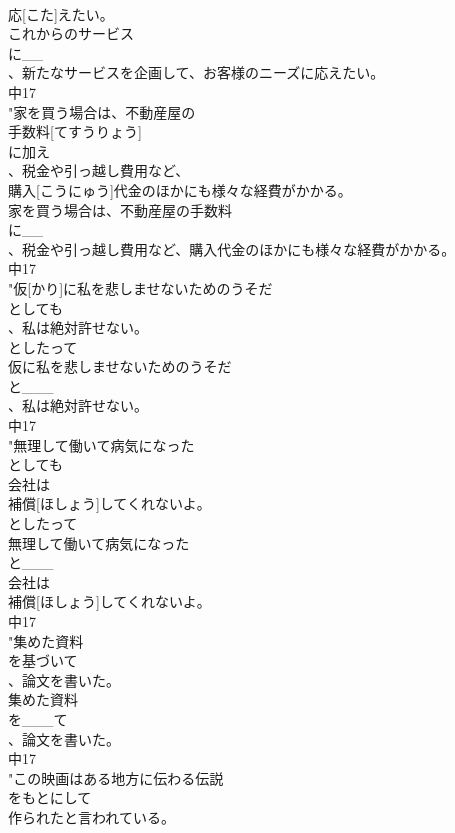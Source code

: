 \documentclass[8pt]{extreport}
\begin{document}
\begin{CJK}{UTF8}{min}
\\	応[こた]えたい。
\\	これからのサービス
\\	に__
\\	、新たなサービスを企画して、お客様のニーズに応えたい。
\\	中17
\\	"家を買う場合は、不動産屋の
\\	手数料[てすうりょう]
\\	に加え
\\	、税金や引っ越し費用など、
\\	購入[こうにゅう]代金のほかにも様々な経費がかかる。
\\	家を買う場合は、不動産屋の手数料
\\	に__
\\	、税金や引っ越し費用など、購入代金のほかにも様々な経費がかかる。
\\	中17
\\	"仮[かり]に私を悲しませないためのうそだ
\\	としても
\\	、私は絶対許せない。
\\	としたって
\\	仮に私を悲しませないためのうそだ
\\	と___
\\	、私は絶対許せない。
\\	中17
\\	"無理して働いて病気になった
\\	としても
\\	会社は
\\	補償[ほしょう]してくれないよ。
\\	としたって
\\	無理して働いて病気になった
\\	と___
\\	会社は
\\	補償[ほしょう]してくれないよ。
\\	中17
\\	"集めた資料
\\	を基づいて
\\	、論文を書いた。
\\	集めた資料
\\	を___て
\\	、論文を書いた。
\\	中17
\\	"この映画はある地方に伝わる伝説
\\	をもとにして
\\	作られたと言われている。

\end{CJK}
\end{document}
